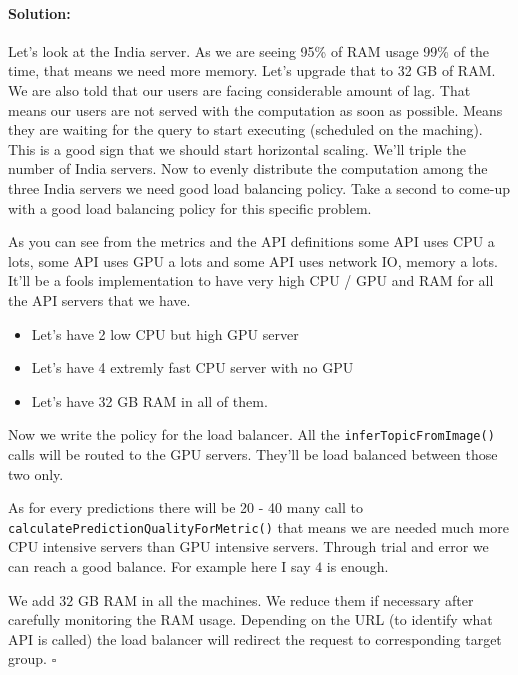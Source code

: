 \documentclass{article}
\newenvironment{answer}{\paragraph{Solution:}}{\hfill$\square$}
\theoremstyle{remark}
\begin{document}
\begin{answer}
    Let's look at the India server. As we are seeing 95\% of RAM
    usage 99\% of the time, that means we need more memory.
    Let's upgrade that to 32 GB of RAM. We are also told that
    our users are facing considerable amount of lag. That means
    our users are not served with the computation as soon as possible.
    Means they are waiting for the query to start executing (scheduled on the maching).
    This is a good sign that we should start horizontal scaling.
    We'll triple the number of India servers. Now to evenly
    distribute the computation among the three India servers we need good
    load balancing policy. Take a second to come-up with a good
    load balancing policy for this specific problem.

    As you can see from the metrics and the API definitions
    some API uses CPU a lots, some API uses GPU a lots and some
    API uses network IO, memory a lots. It'll be a fools implementation
    to have very high CPU / GPU and RAM for all the API servers that
    we have.

    \begin{itemize}
        \item Let's have 2 low CPU but high GPU server
        \item Let's have 4 extremly fast CPU server with no GPU
        \item Let's have 32 GB RAM in all of them.
    \end{itemize}

    Now we write the policy for the load balancer. All the \texttt{inferTopicFromImage()} calls
    will be routed to the GPU servers. They'll be load balanced between those two only.
    
    As for every predictions there will be 20 - 40 many call to \texttt{calculatePredictionQualityForMetric()}
    that means we are needed much more CPU intensive servers than GPU intensive servers. Through trial and error
    we can reach a good balance. For example here I say $4$ is enough.

    We add $32$ GB RAM in all the machines. We reduce them if necessary
    after carefully monitoring the RAM usage. Depending on the URL (to identify what API is called)
    the load balancer will redirect the request to corresponding target group.
\end{answer}
\end{document}
